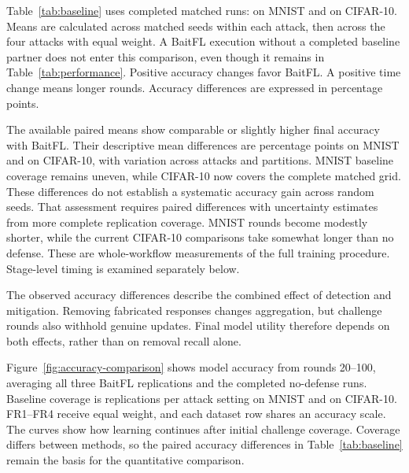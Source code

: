 \documentclass[journal]{IEEEtran}
\begin{document}
Table~\ref{tab:baseline} uses \BaselineMatchedRuns{} completed matched
runs: \BaselineMnistMatchedRuns{} on MNIST and
\BaselineCifarMatchedRuns{} on CIFAR-10. Means are calculated across matched seeds within
each attack, then across the four attacks with equal weight. A BaitFL
execution without a completed baseline partner does not enter this
comparison, even though it remains in Table~\ref{tab:performance}.
Positive accuracy changes favor BaitFL. A positive time change means
longer rounds. Accuracy differences are expressed in percentage points.

The available paired means show comparable or slightly higher final
accuracy with BaitFL. Their descriptive mean differences are
\BaselineMnistGain{} percentage points on MNIST and \BaselineCifarGain{}
on CIFAR-10, with variation across attacks and partitions. MNIST baseline
coverage remains uneven, while CIFAR-10 now covers the complete matched
grid. These differences do not establish a systematic accuracy gain
across random seeds. That assessment requires paired differences with
uncertainty estimates from more complete replication coverage.
MNIST rounds become modestly shorter, while the current CIFAR-10
comparisons take somewhat longer than no defense. These are whole-workflow
measurements of the full training procedure. Stage-level timing is
examined separately below.


The observed accuracy differences describe the combined effect of detection and
mitigation. Removing fabricated responses changes aggregation, but
challenge rounds also withhold genuine updates. Final model utility
therefore depends on both effects, rather than on removal recall alone.

Figure~\ref{fig:accuracy-comparison} shows model accuracy from rounds
20--100, averaging all three BaitFL replications and the completed
no-defense runs. Baseline coverage is \BaselineMnistReplications{}
replications per attack setting on MNIST and \BaselineCifarReplications{}
on CIFAR-10. FR1--FR4 receive equal weight,
and each dataset row shares an accuracy scale. The curves show how
learning continues after initial challenge coverage. Coverage differs
between methods, so the paired accuracy differences in
Table~\ref{tab:baseline} remain the basis for the quantitative comparison.

\end{document}
